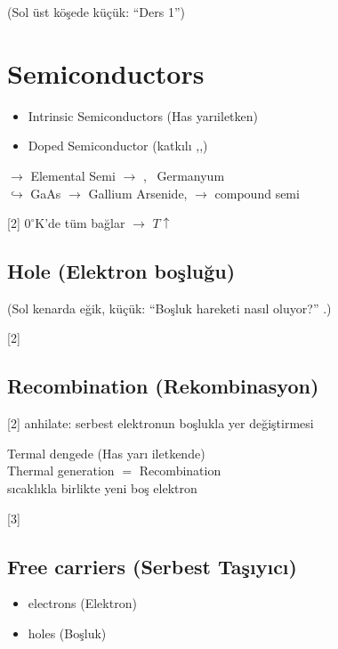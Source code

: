 \documentclass[11pt,a4paper]{article}
\begin{document}
{\small\color{kursunkalem}(Sol üst köşede küçük: ``Ders 1'')}
\section{Semiconductors}
\begin{itemize}
  \item Intrinsic Semiconductors (Has yarıiletken)
  \item Doped Semiconductor (katkılı ,,)
\end{itemize}
$\rightarrow$ Elemental Semi $\rightarrow$ , \ Germanyum\\
$\hookrightarrow$ GaAs $\rightarrow$ Gallium Arsenide, \quad $\rightarrow$ compound semi

[2]
$0^\circ$K'de tüm bağlar  $\rightarrow$ $T\uparrow$

\subsection{Hole (Elektron boşluğu)}
{\small\color{kursunkalem}(Sol kenarda eğik, küçük: ``Boşluk hareketi nasıl oluyor?'' \okunamadi{}.)}

[2]

\subsection{Recombination (Rekombinasyon)}
[2]
anhilate: serbest elektronun boşlukla yer değiştirmesi

\noindent Termal dengede (Has yarı iletkende)\\
Thermal generation $=$ Recombination\\
\hspace*{1.5em}sıcaklıkla birlikte yeni boş elektron 

[3]

\subsection{Free carriers (Serbest Taşıyıcı)}
\begin{itemize}
  \item electrons (Elektron)
  \item holes (Boşluk)
\end{itemize}
\end{document}
